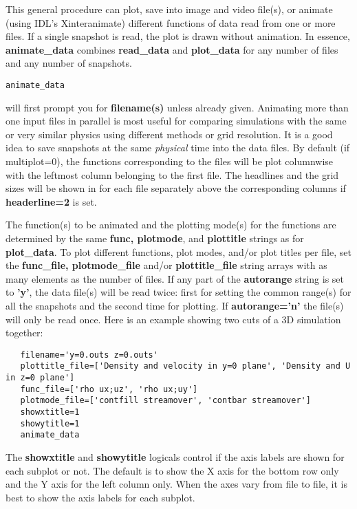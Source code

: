 \documentclass{article}
\begin{document}
   This general procedure can plot, save into image and video file(s), or animate 
   (using IDL's Xinteranimate) different functions of data 
   read from one or more files. If a single snapshot is read, the
   plot is drawn without animation. In essence, {\bf animate\_data} combines
   {\bf read\_data} and {\bf plot\_data} for any number of files and any number 
   of snapshots.
\begin{verbatim}
animate_data
\end{verbatim}
   will first prompt you for {\bf filename(s)} unless already given. 
   Animating more than one input files in parallel is
   most useful for comparing simulations with the same or very similar physics
   using different methods or grid resolution. It is a good idea to save 
   snapshots at the same {\it physical} time into the data files.
   By default (if multiplot=0), 
   the functions corresponding to the files will be plot columnwise
   with the leftmost column belonging to the first file.
   The headlines and the grid sizes will be shown in 
   for each file separately above the corresponding columns
   if {\bf headerline=2} is set.

   The function(s) to be animated and the plotting mode(s) for the functions 
   are determined by the same {\bf func, plotmode}, and {\bf plottitle} 
   strings as for {\bf plot\_data}. To plot different functions, plot modes,
   and/or plot titles per file, set the {\bf func\_file, plotmode\_file} and/or
   {\bf plottitle\_file} string arrays with as many elements as the number of files.
   If any part of the {\bf autorange} string is set to {\bf 'y'},
   the data file(s) will be read twice: first for setting the common range(s) 
   for all the snapshots and the second time for plotting.
   If {\bf autorange='n'} the file(s) will only be read once.
   Here is an example showing two cuts of a 3D simulation together:
\begin{verbatim}
   filename='y=0.outs z=0.outs'
   plottitle_file=['Density and velocity in y=0 plane', 'Density and U in z=0 plane']
   func_file=['rho ux;uz', 'rho ux;uy']
   plotmode_file=['contfill streamover', 'contbar streamover']
   showxtitle=1
   showytitle=1
   animate_data
\end{verbatim}
   The {\bf showxtitle} and {\bf showytitle} logicals control if the axis labels are shown
   for each subplot or not. The default is to show the X axis for the bottom row only
   and the Y axis for the left column only. When the axes vary from file to file, it is best
   to show the axis labels for each subplot.
\end{document}
